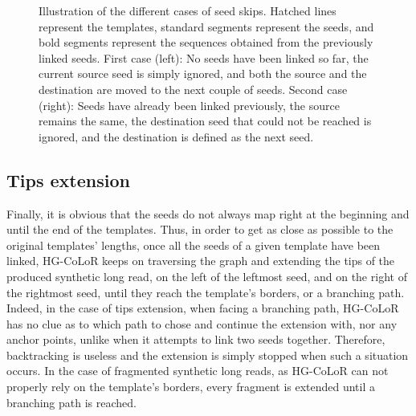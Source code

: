 \documentclass[long, final]{jobim2017}
\begin{document}
\begin{figure}
\begin{center}
{
	}
\end{center}
\caption{Illustration of the different cases of seed skips. Hatched lines represent the templates, standard segments represent
the seeds, and bold segments represent the sequences obtained from the previously linked seeds. First case (left): No seeds have been linked so far, the current source seed is simply ignored, and both the source and the destination are moved to the next couple of seeds. Second case (right): Seeds have already been linked previously, the source remains the same, the destination seed that could not be reached is ignored, and the destination is defined as the next seed. \label{SeedSkipping}}
\end{figure}

\subsection{Tips extension}

Finally, it is obvious that the seeds do not always map right at the beginning and until the end of the templates. Thus, in order to get as close as possible to the original templates' lengths, once all the seeds of a given template have been linked, HG-CoLoR keeps on traversing the graph and extending the tips of the produced synthetic long read, on the left of the leftmost seed, and on the right of the rightmost seed, until they reach the template's borders, or a branching path. Indeed, in the case of tips extension, when facing a branching path, HG-CoLoR has no clue as to which path to chose and continue the extension with, nor any anchor points, unlike when it attempts to link two seeds together. Therefore, backtracking is useless and the extension is simply stopped when such a situation occurs. In the case of fragmented synthetic long reads, as HG-CoLoR can not properly rely on the template's borders, every fragment is extended until a branching path is reached.
\end{document}
